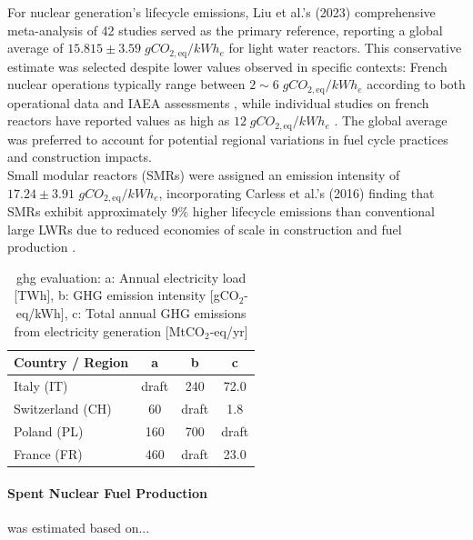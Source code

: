 For nuclear generation's lifecycle emissions, Liu et al.'s (2023) comprehensive meta-analysis of 42 studies \cite{10.3389/fenrg.2023.1147016} served as the primary reference, reporting a global average of $15.815 \pm 3.59 \; gCO_{2,\text{eq}}/kWh_e$ for light water reactors. This conservative estimate was selected despite lower values observed in specific contexts: French nuclear operations typically range between $ 2 \sim 6 \; gCO_{2,\text{eq}}/kWh_e$ according to both operational data \cite{paillere_2021} and IAEA assessments \cite{IAEA_Climate_Change_Nuclear_Power_2022}, while individual studies on french reactors have reported values as high as $12 \; gCO_{2,\text{eq}}/kWh_e$ \cite{paillere_2021}. The global average was preferred to account for potential regional variations in fuel cycle practices and construction impacts. \\

Small modular reactors (SMRs) were assigned an emission intensity of $17.24 \pm 3.91$ $gCO_{2,\text{eq}}/kWh_e$, incorporating Carless et al.'s (2016) finding that SMRs exhibit approximately $9\%$ higher lifecycle emissions than conventional large LWRs due to reduced economies of scale in construction and fuel production \cite{CARLESS201684}. \\

\begin{table}[!ht]
    \centering
    \begin{tabularx}{0.6\textwidth}{X c c c}
        \toprule
        Country / Region & a & b & c \\
        \midrule
        Italy (IT)        & draft & 240 & 72.0 \\
        Switzerland (CH)  & 60  & draft  & 1.8 \\
        Poland (PL)       & 160 & 700 & draft \\
        France (FR)       & 460 & draft  & 23.0 \\
        \bottomrule
    \end{tabularx}
    \caption{\gls{ghg} evaluation: a: Annual electricity load [TWh], b: GHG emission intensity [gCO$_2$-eq/kWh], c: Total annual GHG emissions from electricity generation [MtCO$_2$-eq/yr]}
    \label{tab:ghg-intensity-country}
\end{table}



\paragraph{Spent Nuclear Fuel Production} was estimated based on...


